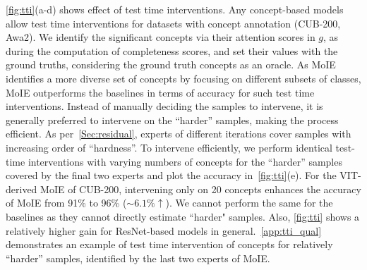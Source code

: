 

\cref{fig:tti}(a-d) shows effect of test time interventions.
Any concept-based models~\cite{koh2020concept, zarlenga2022concept} allow test time interventions for datasets with concept annotation (\eg CUB-200, Awa2). We identify the significant concepts via their attention scores in $g$, as during the computation of completeness scores, and set their values with the ground truths, considering the ground truth concepts as an oracle.
 As MoIE identifies a more diverse set of concepts by focusing on different subsets of classes, MoIE outperforms the baselines in terms of accuracy for such test time interventions. Instead of manually deciding the samples to intervene, it is generally preferred to intervene on the ``harder'' samples, making the process efficient. As per~\cref{Sec:residual}, experts of different iterations cover samples with increasing order of ``hardness''. To intervene efficiently, we perform identical test-time interventions with varying numbers of concepts for the ``harder'' samples covered by the final two experts and plot the accuracy in~\cref{fig:tti}(e). For the VIT-derived MoIE of CUB-200, intervening only on 20 concepts enhances the accuracy of MoIE from 91\% to 96\% ($\sim 6.1\% \uparrow$). We cannot perform the same for the baselines as they cannot directly estimate ``harder" samples. Also, \cref{fig:tti} shows a relatively higher gain for ResNet-based models in general.~\cref{app:tti_qual} demonstrates an example of test time intervention of concepts for relatively ``harder'' samples, identified by the last two experts of MoIE.